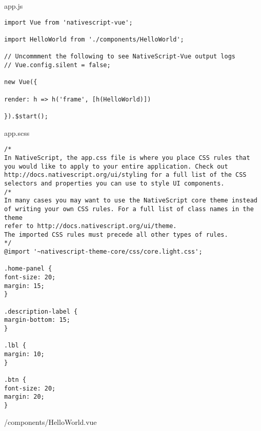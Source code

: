 \chapter{}
\label{ch:broncode_app}
app.js
\begin{verbatim}
import Vue from 'nativescript-vue';

import HelloWorld from './components/HelloWorld';

// Uncommment the following to see NativeScript-Vue output logs
// Vue.config.silent = false;

new Vue({

render: h => h('frame', [h(HelloWorld)])

}).$start();
\end{verbatim}
app.scss
\begin{verbatim}
/*
In NativeScript, the app.css file is where you place CSS rules that
you would like to apply to your entire application. Check out
http://docs.nativescript.org/ui/styling for a full list of the CSS
selectors and properties you can use to style UI components.
/*
In many cases you may want to use the NativeScript core theme instead
of writing your own CSS rules. For a full list of class names in the theme
refer to http://docs.nativescript.org/ui/theme.
The imported CSS rules must precede all other types of rules.
*/
@import '~nativescript-theme-core/css/core.light.css';

.home-panel {
font-size: 20;
margin: 15;
}

.description-label {
margin-bottom: 15;
}

.lbl {
margin: 10;
}

.btn {
font-size: 20;
margin: 20;
}
\end{verbatim}
/components/HelloWorld.vue
